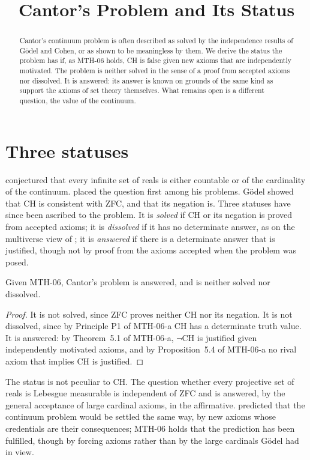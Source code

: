 \documentclass{situationist-preprint}
\title{Cantor's Problem and Its Status}
\begin{document}
\maketitle

\begin{abstract}
Cantor's continuum problem is often described as solved by the independence results of G\"odel and Cohen, or as shown to be meaningless by them. We derive the status the problem has if, as MTH-06 holds, CH is false given new axioms that are independently motivated. The problem is neither solved in the sense of a proof from accepted axioms nor dissolved. It is answered: its answer is known on grounds of the same kind as support the axioms of set theory themselves. What remains open is a different question, the value of the continuum.
\end{abstract}

\section{Three statuses}\label{s:status}

\citet{Cantor1878} conjectured that every infinite set of reals is either countable or of the cardinality of the continuum. \citet{Hilbert1900} placed the question first among his problems. G\"odel showed that CH is consistent with ZFC, and \citet{Cohen1963} that its negation is. Three statuses have since been ascribed to the problem. It is \emph{solved} if CH or its negation is proved from accepted axioms; it is \emph{dissolved} if it has no determinate answer, as on the multiverse view of \citet{Hamkins2012}; it is \emph{answered} if there is a determinate answer that is justified, though not by proof from the axioms accepted when the problem was posed.

\begin{proposition}\label{p:status}
Given MTH-06, Cantor's problem is answered, and is neither solved nor dissolved.
\end{proposition}

\begin{proof}
It is not solved, since ZFC proves neither CH nor its negation. It is not dissolved, since by Principle P1 of MTH-06-a CH has a determinate truth value. It is answered: by Theorem~5.1 of MTH-06-a, $\neg$CH is justified given independently motivated axioms, and by Proposition~5.4 of MTH-06-a no rival axiom that implies CH is justified.
\end{proof}

The status is not peculiar to CH. The question whether every projective set of reals is Lebesgue measurable is independent of ZFC and is answered, by the general acceptance of large cardinal axioms, in the affirmative. \citet{Godel1947} predicted that the continuum problem would be settled the same way, by new axioms whose credentials are their consequences; MTH-06 holds that the prediction has been fulfilled, though by forcing axioms rather than by the large cardinals G\"odel had in view.
\end{document}
